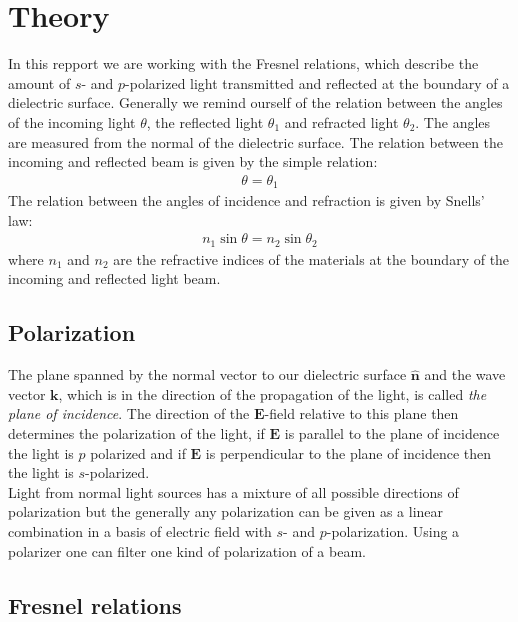 \section{Theory}
In this repport we are working with the Fresnel relations, which describe the amount of $s$- and $p$-polarized light transmitted and reflected at the boundary of a dielectric surface. Generally we remind ourself of the relation between the angles of the incoming light $\theta$, the reflected light $\theta_1$ and refracted light $\theta_2$. The angles are measured from the normal of the dielectric surface.
The relation between the incoming and reflected beam is given by the simple relation:
%
\begin{align}
\theta = \theta_1
\end{align}
%
The relation between the angles of incidence and refraction is given by Snells' law:
%
\begin{align}
n_1\sin{\theta}=n_2\sin{\theta_2}
\end{align}
%
where $n_1$ and $n_2$ are the refractive indices of the materials at the boundary of the incoming and reflected light beam.

\subsection{Polarization}

The plane spanned by the normal vector to our dielectric surface $\hat{\textbf{n}}$ and the wave vector $\textbf{k}$, which is in the direction of the propagation of the light, is called \textit{the plane of incidence}. The direction of the $\textbf{E}$-field relative to this plane then determines the polarization of the light, if $\textbf{E}$ is parallel to the plane of incidence the light is $p$ polarized and if $\textbf{E}$ is perpendicular to the plane of incidence then the light is $s$-polarized. \\


Light from normal light sources has a mixture of all possible directions of polarization but the generally any polarization can be given as a linear combination in a basis of electric field with $s$- and $p$-polarization. Using a polarizer one can filter one kind of polarization of a beam.


\subsection{Fresnel relations}


